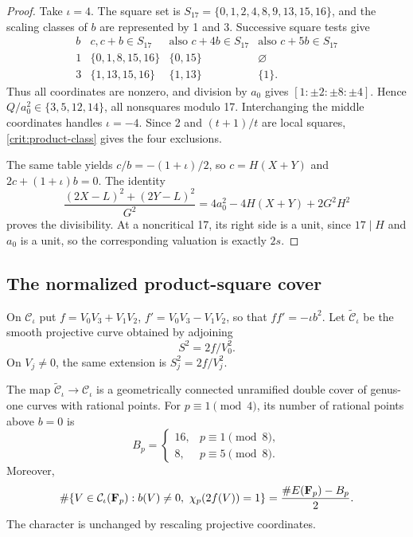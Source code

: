 \begin{proof}
Take \(\iota=4\). The square set is
\(S_{17}=\{0,1,2,4,8,9,13,15,16\}\), and the scaling classes of
\(b\) are represented by 1 and 3. Successive square tests give
\[
\begin{array}{c|c|c|c}
b&c,c+b\in S_{17}&\text{also }c+4b\in S_{17}
 &\text{also }c+5b\in S_{17}\\\hline
1&\{0,1,8,15,16\}&\{0,15\}&\varnothing\\
3&\{1,13,15,16\}&\{1,13\}&\{1\}.
\end{array}
\]
Thus all coordinates are nonzero, and division by \(a_0\) gives
\([1:\pm2:\pm8:\pm4]\). Hence
\(Q/a_0^2\in\{3,5,12,14\}\), all nonsquares modulo 17.
Interchanging the middle coordinates handles \(\iota=-4\).
Since 2 and \((t+1)/t\) are local squares,
\eqref{crit:product-class} gives the four exclusions.

The same table yields \(c/b=-(1+\iota)/2\), so
\(c=H(X+Y)\) and \(2c+(1+\iota)b=0\).
The identity
\begin{equation}\label{crit:center-identity}
 \frac{(2X-L)^2+(2Y-L)^2}{G^2}
 =4a_0^2-4H(X+Y)+2G^2H^2
\end{equation}
proves the divisibility. At a noncritical 17, its right side is a unit,
since \(17\mid H\) and \(a_0\) is a unit, so the corresponding
valuation is exactly \(2s\).
\end{proof}

\subsection{The normalized product-square cover}

On \(\mathcal C_\iota\) put
\(f=V_0V_3+V_1V_2\), \(f'=V_0V_3-V_1V_2\), so that
\(ff'=-\iota b^2\). Let \(\widetilde{\mathcal C}_\iota\) be the
smooth projective curve obtained by adjoining
\begin{equation}\label{crit:double}
 S^2=2f/V_0^2.
\end{equation}
On \(V_j\ne0\), the same extension is \(S_j^2=2f/V_j^2\).

\begin{proposition}\label{prop:crit-double}
The map \(\widetilde{\mathcal C}_\iota\to\mathcal C_\iota\) is a
geometrically connected unramified double cover of genus-one curves
with rational points. For \(p\equiv1\pmod4\), its number of
rational points above \(b=0\) is
\[
 B_p=\begin{cases}16,&p\equiv1\pmod8,\\8,&p\equiv5\pmod8.
 \end{cases}
\]
Moreover,
\begin{equation}\label{crit:double-count}
 \#\{V\in\mathcal C_\iota(\mathbf F_p):b(V)\ne0,\ \chi_p(2f(V))=1\}
 =\frac{\#E(\mathbf F_p)-B_p}{2}.
\end{equation}
The character is unchanged by rescaling projective coordinates.
\end{proposition}

